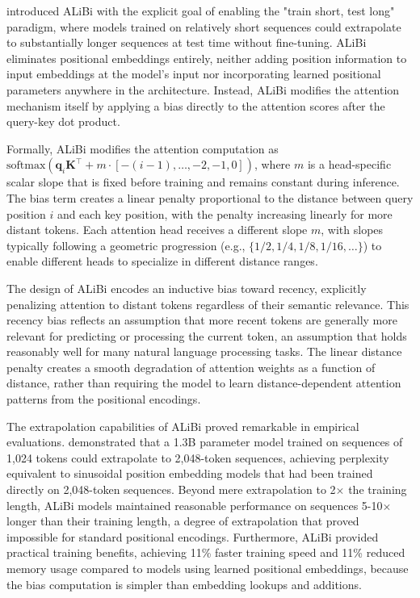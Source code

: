 \documentclass[11pt,letterpaper]{article}
\begin{document}
\cite{press2022train} introduced ALiBi with the explicit goal of enabling the "train short, test long" paradigm, where models trained on relatively short sequences could extrapolate to substantially longer sequences at test time without fine-tuning. ALiBi eliminates positional embeddings entirely, neither adding position information to input embeddings at the model's input nor incorporating learned positional parameters anywhere in the architecture. Instead, ALiBi modifies the attention mechanism itself by applying a bias directly to the attention scores after the query-key dot product.

Formally, ALiBi modifies the attention computation as $\text{softmax}(\mathbf{q}_i \mathbf{K}^\top + m \cdot [-(i-1), \ldots, -2, -1, 0])$, where $m$ is a head-specific scalar slope that is fixed before training and remains constant during inference. The bias term creates a linear penalty proportional to the distance between query position $i$ and each key position, with the penalty increasing linearly for more distant tokens. Each attention head receives a different slope $m$, with slopes typically following a geometric progression (e.g., $\{1/2, 1/4, 1/8, 1/16, \ldots\}$) to enable different heads to specialize in different distance ranges.

The design of ALiBi encodes an inductive bias toward recency, explicitly penalizing attention to distant tokens regardless of their semantic relevance. This recency bias reflects an assumption that more recent tokens are generally more relevant for predicting or processing the current token, an assumption that holds reasonably well for many natural language processing tasks. The linear distance penalty creates a smooth degradation of attention weights as a function of distance, rather than requiring the model to learn distance-dependent attention patterns from the positional encodings.

The extrapolation capabilities of ALiBi proved remarkable in empirical evaluations. \cite{press2022train} demonstrated that a 1.3B parameter model trained on sequences of 1,024 tokens could extrapolate to 2,048-token sequences, achieving perplexity equivalent to sinusoidal position embedding models that had been trained directly on 2,048-token sequences. Beyond mere extrapolation to 2$\times$ the training length, ALiBi models maintained reasonable performance on sequences 5-10$\times$ longer than their training length, a degree of extrapolation that proved impossible for standard positional encodings. Furthermore, ALiBi provided practical training benefits, achieving 11\% faster training speed and 11\% reduced memory usage compared to models using learned positional embeddings, because the bias computation is simpler than embedding lookups and additions.
\end{document}
